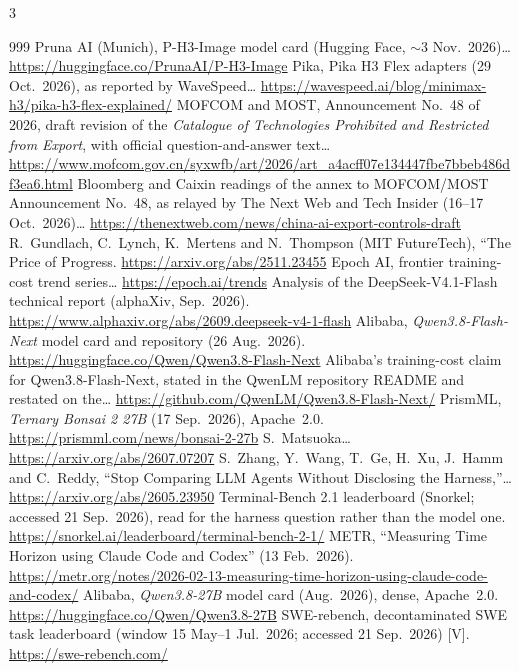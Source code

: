 \begin{multicols}{3}
\begin{thebibliography}{999}
 Pruna AI (Munich), P-H3-Image model card (Hugging Face, $\sim$3 Nov.\ 2026)… \url{https://huggingface.co/PrunaAI/P-H3-Image}
 Pika, Pika H3 Flex adapters (29 Oct.\ 2026), as reported by WaveSpeed… \url{https://wavespeed.ai/blog/minimax-h3/pika-h3-flex-explained/}
 MOFCOM and MOST, Announcement No.~48 of 2026, draft revision of the \emph{Catalogue of Technologies Prohibited and Restricted from Export}, with official question-and-answer text… \url{https://www.mofcom.gov.cn/syxwfb/art/2026/art_a4acff07e134447fbe7bbeb486df3ea6.html}
 Bloomberg and Caixin readings of the annex to MOFCOM/MOST Announcement No.~48, as relayed by The Next Web and Tech Insider (16--17 Oct.\ 2026)… \url{https://thenextweb.com/news/china-ai-export-controls-draft}
 R.~Gundlach, C.~Lynch, K.~Mertens and N.~Thompson (MIT FutureTech), ``The Price of Progress. \url{https://arxiv.org/abs/2511.23455}
 Epoch AI, frontier training-cost trend series… \url{https://epoch.ai/trends}
 Analysis of the DeepSeek-V4.1-Flash technical report (alphaXiv, Sep.\ 2026). \url{https://www.alphaxiv.org/abs/2609.deepseek-v4-1-flash}
 Alibaba, \emph{Qwen3.8-Flash-Next} model card and repository (26 Aug.\ 2026). \url{https://huggingface.co/Qwen/Qwen3.8-Flash-Next}
 Alibaba's training-cost claim for Qwen3.8-Flash-Next, stated in the QwenLM repository README and restated on the… \url{https://github.com/QwenLM/Qwen3.8-Flash-Next/}
 PrismML, \emph{Ternary Bonsai 2 27B} (17 Sep.\ 2026), Apache~2.0. \url{https://prismml.com/news/bonsai-2-27b}
 S.~Matsuoka… \url{https://arxiv.org/abs/2607.07207}
 S.~Zhang, Y.~Wang, T.~Ge, H.~Xu, J.~Hamm and C.~Reddy, ``Stop Comparing LLM Agents Without Disclosing the Harness,''… \url{https://arxiv.org/abs/2605.23950}
 Terminal-Bench 2.1 leaderboard (Snorkel; accessed 21 Sep.\ 2026), read for the harness question rather than the model one. \url{https://snorkel.ai/leaderboard/terminal-bench-2-1/}
 METR, ``Measuring Time Horizon using Claude Code and Codex'' (13 Feb.\ 2026). \url{https://metr.org/notes/2026-02-13-measuring-time-horizon-using-claude-code-and-codex/}
 Alibaba, \emph{Qwen3.8-27B} model card (Aug.\ 2026), dense, Apache~2.0. \url{https://huggingface.co/Qwen/Qwen3.8-27B}
 SWE-rebench, decontaminated SWE task leaderboard (window 15 May--1 Jul.\ 2026; accessed 21 Sep.\ 2026) [V]. \url{https://swe-rebench.com/}

\end{thebibliography}
\end{multicols}
